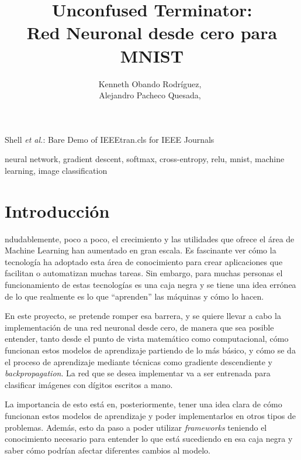 \documentclass[journal]{IEEEtran}
\begin{document}

    \title{Unconfused Terminator:\\ Red Neuronal desde cero para MNIST}

    \author{Kenneth Obando Rodríguez,~\\
            Alejandro Pacheco Quesada,~}

    {Shell \MakeLowercase{\textit{et al.}}: Bare Demo of IEEEtran.cls for IEEE Journals}

    \maketitle

    
\begin{abstract}

\end{abstract}

\begin{IEEEkeywords}
neural network, gradient descent, softmax, cross-entropy, relu, mnist, machine learning, image classification
\end{IEEEkeywords}

\IEEEpeerreviewmaketitle


\section{Introducción}
ndudablemente, poco a poco, el crecimiento y las utilidades que ofrece el área de Machine Learning han aumentado en gran escala. Es 
fascinante ver cómo la tecnología ha adoptado esta área de conocimiento para crear aplicaciones que facilitan o automatizan
muchas tareas. Sin embargo, para muchas personas el funcionamiento
de estas tecnologías es una caja negra y se tiene una idea errónea
de lo que realmente es lo que ``aprenden'' las máquinas y cómo lo hacen.
\par En este proyecto, se pretende romper esa barrera, y se quiere llevar a cabo la implementación de una red neuronal desde cero, de manera que sea posible entender, tanto desde el punto de vista matemático como computacional, cómo funcionan estos modelos de aprendizaje partiendo
de lo más básico, y cómo se da el proceso de aprendizaje mediante
técnicas como gradiente descendiente y \textit{backpropagation}. La red
que se desea implementar va a ser entrenada para clasificar imágenes con
dígitos escritos a mano.
\par La importancia de esto está en, posteriormente, tener una
idea clara de cómo funcionan estos modelos de aprendizaje y poder
implementarlos en otros tipos de problemas. Además, esto da paso
a poder utilizar \textit{frameworks} teniendo el conocimiento necesario para entender lo que está
sucediendo en esa caja negra y saber cómo podrían afectar diferentes cambios al modelo.
\end{document}
